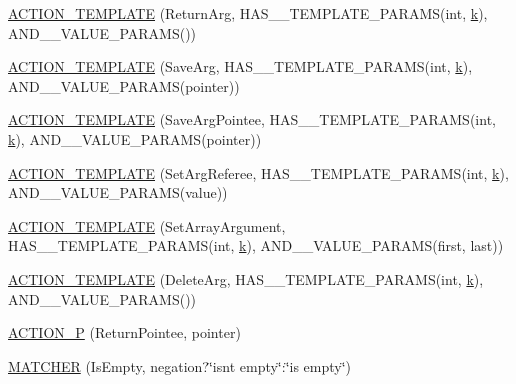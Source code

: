 \begin{DoxyCompactItemize}
\item 
\hyperlink{namespacetesting_a109d48f969260878ed1e743006196992}{A\+C\+T\+I\+O\+N\+\_\+\+T\+E\+M\+P\+L\+A\+TE} (Return\+Arg, H\+A\+S\+\_\+\_\+\+T\+E\+M\+P\+L\+A\+T\+E\+\_\+\+P\+A\+R\+A\+MS(int, \hyperlink{jquery_8js_ab26645c014aa005ecedef329ecf58c99}{k}), A\+N\+D\+\_\+\_\+\+V\+A\+L\+U\+E\+\_\+\+P\+A\+R\+A\+MS())
\item 
\hyperlink{namespacetesting_a0478a3464d31f6726d5bc47b1be46491}{A\+C\+T\+I\+O\+N\+\_\+\+T\+E\+M\+P\+L\+A\+TE} (Save\+Arg, H\+A\+S\+\_\+\_\+\+T\+E\+M\+P\+L\+A\+T\+E\+\_\+\+P\+A\+R\+A\+MS(int, \hyperlink{jquery_8js_ab26645c014aa005ecedef329ecf58c99}{k}), A\+N\+D\+\_\+\_\+\+V\+A\+L\+U\+E\+\_\+\+P\+A\+R\+A\+MS(pointer))
\item 
\hyperlink{namespacetesting_a31565a90ad7f08c1a88e4b138957172c}{A\+C\+T\+I\+O\+N\+\_\+\+T\+E\+M\+P\+L\+A\+TE} (Save\+Arg\+Pointee, H\+A\+S\+\_\+\_\+\+T\+E\+M\+P\+L\+A\+T\+E\+\_\+\+P\+A\+R\+A\+MS(int, \hyperlink{jquery_8js_ab26645c014aa005ecedef329ecf58c99}{k}), A\+N\+D\+\_\+\_\+\+V\+A\+L\+U\+E\+\_\+\+P\+A\+R\+A\+MS(pointer))
\item 
\hyperlink{namespacetesting_adfd3c9538285d257370f955aa81488f1}{A\+C\+T\+I\+O\+N\+\_\+\+T\+E\+M\+P\+L\+A\+TE} (Set\+Arg\+Referee, H\+A\+S\+\_\+\_\+\+T\+E\+M\+P\+L\+A\+T\+E\+\_\+\+P\+A\+R\+A\+MS(int, \hyperlink{jquery_8js_ab26645c014aa005ecedef329ecf58c99}{k}), A\+N\+D\+\_\+\_\+\+V\+A\+L\+U\+E\+\_\+\+P\+A\+R\+A\+MS(value))
\item 
\hyperlink{namespacetesting_a2b0f090219db3bb0630d5ce6f7d911d8}{A\+C\+T\+I\+O\+N\+\_\+\+T\+E\+M\+P\+L\+A\+TE} (Set\+Array\+Argument, H\+A\+S\+\_\+\_\+\+T\+E\+M\+P\+L\+A\+T\+E\+\_\+\+P\+A\+R\+A\+MS(int, \hyperlink{jquery_8js_ab26645c014aa005ecedef329ecf58c99}{k}), A\+N\+D\+\_\+\_\+\+V\+A\+L\+U\+E\+\_\+\+P\+A\+R\+A\+MS(first, last))
\item 
\hyperlink{namespacetesting_a37a5ebfe68fd8dedf8bd82a5ebddcb7b}{A\+C\+T\+I\+O\+N\+\_\+\+T\+E\+M\+P\+L\+A\+TE} (Delete\+Arg, H\+A\+S\+\_\+\_\+\+T\+E\+M\+P\+L\+A\+T\+E\+\_\+\+P\+A\+R\+A\+MS(int, \hyperlink{jquery_8js_ab26645c014aa005ecedef329ecf58c99}{k}), A\+N\+D\+\_\+\_\+\+V\+A\+L\+U\+E\+\_\+\+P\+A\+R\+A\+MS())
\item 
\hyperlink{namespacetesting_a3d58f0d746946064154cd257d368599d}{A\+C\+T\+I\+O\+N\+\_\+P} (Return\+Pointee, pointer)
\item 
\hyperlink{namespacetesting_a25b4065291778029b6311f07c2fc9cc3}{M\+A\+T\+C\+H\+ER} (Is\+Empty, negation?\char`\"{}isn\textquotesingle{}t empty\char`\"{}\+:\char`\"{}is empty\char`\"{})

\end{DoxyCompactItemize}
